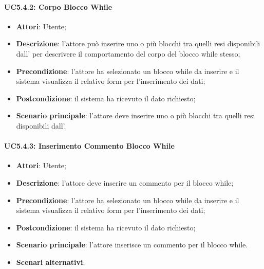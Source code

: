 \paragraph{UC5.4.2: Corpo Blocco While}
\label{UC5.4.2}
\begin{itemize}
\item \textbf{Attori}: Utente;
\item \textbf{Descrizione}: l'attore può inserire uno o più blocchi tra quelli resi disponibili dall' per descrivere il comportamento del corpo del blocco while stesso;	
\item \textbf{Precondizione}: l'attore ha selezionato un blocco while da inserire e il sistema visualizza il relativo form per l'inserimento dei dati;	
\item \textbf{Postcondizione}: il sistema ha ricevuto il dato richiesto;	
\item \textbf{Scenario principale}:
l'attore deve inserire uno o più blocchi tra quelli resi disponibili dall'.	
\end{itemize}

\paragraph{UC5.4.3: Inserimento Commento Blocco While	}
\label{UC5.4.3}
\begin{itemize}
\item \textbf{Attori}: Utente;
\item \textbf{Descrizione}: l'attore deve inserire un commento per il blocco while;	
\item \textbf{Precondizione}: l'attore ha selezionato un blocco while da inserire e il sistema visualizza il relativo form per l'inserimento dei dati;	
\item \textbf{Postcondizione}: il sistema ha ricevuto il dato richiesto;	
\item \textbf{Scenario principale}:
l'attore inserisce un commento per il blocco while.
\item \textbf{Scenari alternativi}:
	

\end{itemize}


